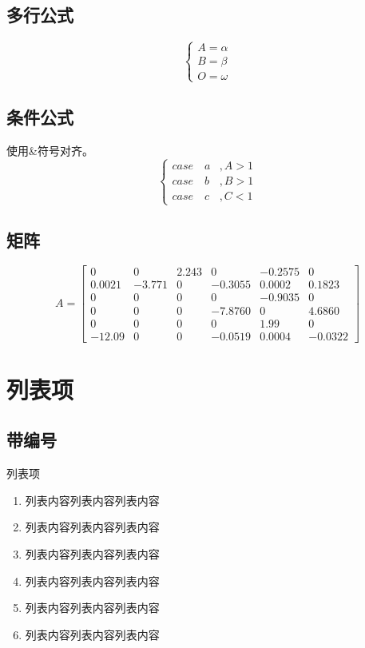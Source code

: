 \subsection{多行公式}

\begin{equation}
	\left\{\begin{array}{l}
		A = \alpha  \\
		B = \beta \\
		O = \omega
	\end{array}\right.
\end{equation}


\subsection{条件公式}
使用\&符号对齐。
\begin{equation}
	\begin{cases}
		case\quad a & , A>1  
		\\ case\quad b & , B>1 
		\\ case\quad c & , C<1
	\end{cases}
\end{equation}
\subsection{矩阵}

\begin{equation}\label{eq::example_tab}
	A=
	\begin{bmatrix}
		0 & 0 & 2.243 & 0 & -0.2575 & 0\\
		0.0021 & -3.771 & 0 & -0.3055 & 0.0002 & 0.1823\\
		0 & 0 & 0 & 0 & -0.9035 &0 \\
		0 & 0 & 0 & -7.8760 & 0 & 4.6860\\
		0 & 0 & 0 & 0 & 1.99 & 0\\
		-12.09 & 0 & 0 & -0.0519 & 0.0004 &-0.0322
	\end{bmatrix}
\end{equation}


\section{列表项}

\subsection{带编号}
	列表项
	
	\begin{enumerate}[label=(\arabic*),listparindent=2em,left = 2em,topsep = 0pt,itemsep = 0pt,parsep= 0pt,partopsep=0pt]
		\item 列表内容列表内容列表内容
		\item 列表内容列表内容列表内容
		\item 列表内容列表内容列表内容
		\item 列表内容列表内容列表内容
		\item 列表内容列表内容列表内容
		\item 列表内容列表内容列表内容
	\end{enumerate}
	

